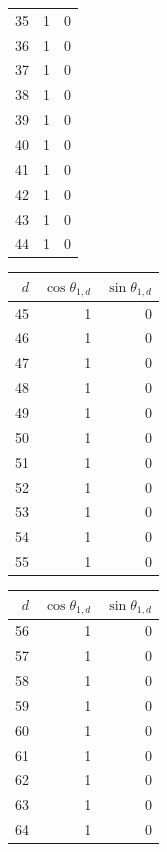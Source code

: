 {\begin{tabular}[t]{r|rr}
35 & 1 & 0 \\
36 & 1 & 0 \\
37 & 1 & 0 \\
38 & 1 & 0 \\
39 & 1 & 0 \\
40 & 1 & 0 \\
41 & 1 & 0 \\
42 & 1 & 0 \\
43 & 1 & 0 \\
44 & 1 & 0
\end{tabular}\kern4pt
\begin{tabular}[t]{r|rr}
$d$ & $\cos\theta_{1,d}$ & $\sin\theta_{1,d}$ \\\hline
45 & 1 & 0 \\
46 & 1 & 0 \\
47 & 1 & 0 \\
48 & 1 & 0 \\
49 & 1 & 0 \\
50 & 1 & 0 \\
51 & 1 & 0 \\
52 & 1 & 0 \\
53 & 1 & 0 \\
54 & 1 & 0 \\
55 & 1 & 0
\end{tabular}\kern4pt
\begin{tabular}[t]{r|rr}
$d$ & $\cos\theta_{1,d}$ & $\sin\theta_{1,d}$ \\\hline
56 & 1 & 0 \\
57 & 1 & 0 \\
58 & 1 & 0 \\
59 & 1 & 0 \\
60 & 1 & 0 \\
61 & 1 & 0 \\
62 & 1 & 0 \\
63 & 1 & 0 \\
64 & 1 & 0
\end{tabular}}

